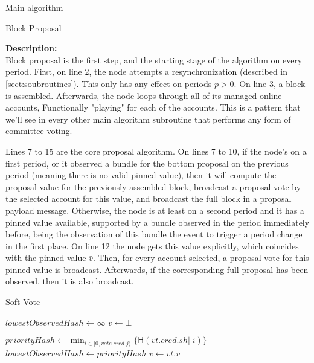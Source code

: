\documentclass[10pt,a4paper]{article}
\begin{document}
\begin{section}{Main algorithm}
\begin{subsection}{Block Proposal}
\newpage

\noindent \textbf{Description:}\\
Block proposal is the first step, and the starting stage of the algorithm on every period.
First, on line 2, the node attempts a resynchronization (described in \ref{sect:soubroutines}). 
This only has any effect on periods $p > 0$. On line 3, a block is assembled.
Afterwards, the node loops through all of its managed online accounts, Functionally
"playing" for each of the accounts. This is a pattern that we'll see in every other
main algorithm subroutine that performs any form of committee voting.

Lines 7 to 15 are the core proposal algorithm. On lines 7 to 10, 
if the node's on a first period, or it observed a bundle for the bottom proposal on the previous 
period (meaning there is no valid pinned value), then it will compute the proposal-value for the 
previously assembled block, broadcast a proposal vote by the selected account for this value, and 
broadcast the full block in a proposal payload message.
Otherwise, the node is at least on a second period and it has a pinned value available, supported by a 
bundle observed in the period immediately before, being the observation of this bundle the event to trigger 
a period change in the first place. On line 12 the node gets this value explicitly, which coincides with the pinned
value $\bar{v}$. 
Then, for every account selected, a proposal vote for this pinned value is broadcast. Afterwards, 
if the corresponding full proposal has been observed, then it is also broadcast.


\end{subsection}
\begin{subsection}{Soft Vote}\label{ssect:softvote}

\begin{algorithm}[H]
    \begin{algorithmic}[1]
    \State $lowestObservedHash \gets \infty$
    \State $v \gets \bot$ 


        \State $priorityHash \gets \min_{i \in [0, vote.cred.j)} \{ \mathsf{H}(vt.cred.sh || i)\}$
            \State $lowestObservedHash \gets priorityHash$
            \State $v \gets vt.v$
        \EndIf    
    \EndFor


\end{algorithmic}
\end{algorithm}
\end{subsection}
\end{section}
\end{document}
